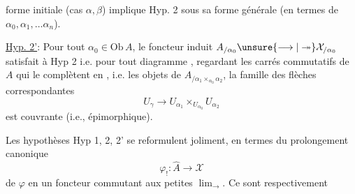 
forme initiale (cas $\alpha,\beta$) implique Hyp. 2 sous sa forme générale (en termes de $\alpha_0,\alpha_1,\ldots\alpha_n$).

\uline{Hyp. 2'}: Pour tout $\alpha_0\in\mathrm{Ob}\,A$, le foncteur induit $A_{/\alpha_0}\unsure{\longrightarrow|\twoheadrightarrow}\mathcal X_{/\alpha_0}$ satisfait à Hyp 2 i.e. pour tout diagramme
, regardant les carrés commutatifs de $A$ qui le complètent en
, i.e. les objets de $A_{/\alpha_1\times_{\alpha_0}\alpha_2}$, la famille des flèches correspondantes
\[U_\gamma\longrightarrow U_{\alpha_1}\times_{U_{\alpha_0}}U_{\alpha_2}\]
est couvrante (i.e., épimorphique).

Les hypothèses Hyp 1, 2, 2' se reformulent joliment, en termes du prolongement canonique
\[\varphi_!:\widehat A\longrightarrow\mathcal X\]
de $\varphi$ en un foncteur  commutant  aux petites $\lim_{\longrightarrow}$. Ce sont respectivement
